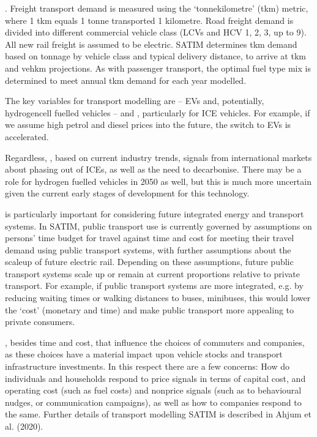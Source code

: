 \documentclass[letterpaper,10pt,english]{jupyterBook}
\begin{document}
\sphinxAtStartPar
{}. Freight transport demand is measured using the ‘tonne\sphinxhyphen{}kilometre’ (tkm) metric, where 1 tkm equals 1 tonne transported 1 kilometre. Road freight demand is divided into different commercial vehicle class (LCVs and HCV 1, 2, 3, up to 9). All new rail freight is assumed to be electric. SATIM determines tkm demand based on tonnage by vehicle class and typical delivery distance, to arrive at tkm and veh\sphinxhyphen{}km projections. As with passenger transport, the optimal fuel type mix is determined to meet annual tkm demand for each year modelled.

\sphinxAtStartPar
The key variables for transport modelling are  – EVs and, potentially, hydrogen\sphinxhyphen{}cell fuelled vehicles – and , particularly for ICE vehicles. For example, if we assume high petrol and diesel prices into the future, the switch to EVs is accelerated.

\sphinxAtStartPar
Regardless, , based on current industry trends, signals from international markets about phasing out of ICEs, as well as the need to decarbonise. There may be a role for hydrogen fuelled vehicles in 2050 as well, but this is much more uncertain given the current early stages of development for this technology.

\sphinxAtStartPar
{} is particularly important for considering future integrated energy and transport systems. In SATIM, public transport use is currently governed by assumptions on persons’ time budget for travel against time and cost for meeting their travel demand using public transport systems, with further assumptions about the scale\sphinxhyphen{}up of future electric rail. Depending on these assumptions, future public transport systems scale up or remain at current proportions relative to private transport. For example, if public transport systems are more integrated, e.g. by reducing waiting times or walking distances to buses, minibuses, this would lower the ‘cost’ (monetary and time) and make public transport more appealing to private consumers.

\sphinxAtStartPar
{}, besides time and cost, that influence the choices of commuters and companies, as these choices have a material impact upon vehicle stocks and transport infrastructure investments. In this respect there are a few concerns: How do individuals and households respond to price signals in terms of capital cost, and operating cost (such as fuel costs) and non\sphinxhyphen{}price signals (such as to behavioural nudges, or communication campaigns), as well as how to companies respond to the same. Further details of transport modelling SATIM is described in Ahjum et al. (2020).
\end{document}

